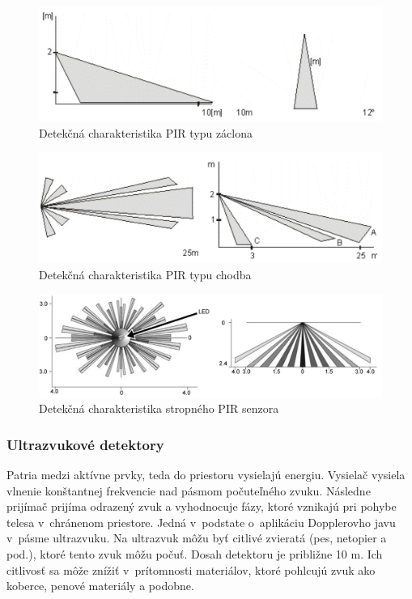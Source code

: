 \begin{figure}[!ht]
    \centering
    \includegraphics[width=0.75\linewidth]{obrazky-figures/PIR-zaclona.png}
    \caption[Detekčná charakteristika PIR typu záclona]{Detekčná charakteristika PIR typu záclona\cite{velas_ezs}}
    \label{fig:pir-zaclona}
\end{figure}

\begin{figure}[!ht]
    \centering
    \includegraphics[width=0.75\linewidth]{obrazky-figures/PIR-chodba.png}
    \caption[Detekčná charakteristika PIR typu chodba]{Detekčná charakteristika PIR typu chodba\cite{velas_ezs}}
    \label{fig:pir-chodba}
\end{figure}

\begin{figure}[!ht]
    \centering
    \includegraphics[width=0.75\linewidth]{obrazky-figures/PIR-strop.jpg}
    \caption[Detekčná charakteristika stropného PIR senzora]{Detekčná charakteristika stropného PIR senzora\cite{PIR-strop}}
    \label{fig:pir-strop}
\end{figure}

\subsubsection{Ultrazvukové detektory}

Patria medzi aktívne prvky, teda do priestoru vysielajú energiu. Vysielač vysiela vlnenie konštantnej frekvencie nad pásmom počuteľného zvuku. Následne prijímač prijíma odrazený zvuk a vyhodnocuje fázy, ktoré vznikajú pri pohybe telesa v~chránenom priestore. Jedná v~podstate o~aplikáciu Dopplerovho javu v~pásme ultrazvuku. Na ultrazvuk môžu byť citlivé zvieratá (pes, netopier a pod.), ktoré tento zvuk môžu počuť. Dosah detektoru je približne 10 m. Ich citlivosť sa môže znížiť v~prítomnosti materiálov, ktoré pohlcujú zvuk ako koberce, penové materiály a podobne.\cite{Krecek}

